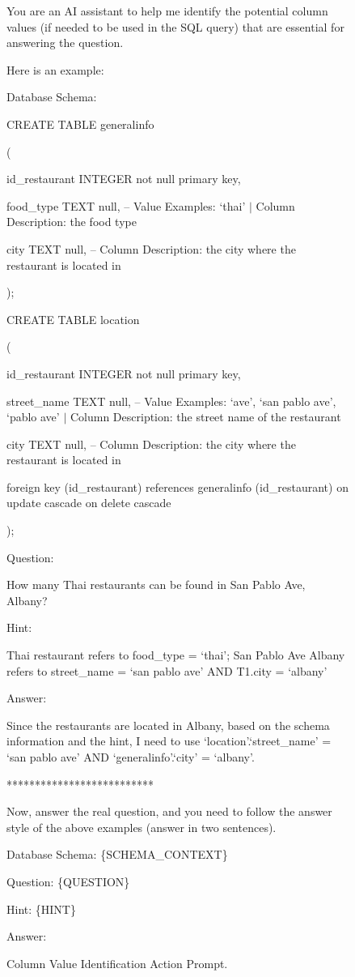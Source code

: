 \begin{figure}[t!]
    \centering
    \begin{tcolorbox}[
        title=Column Value Identification Action Prompt,
        colback=white,        %
        colframe=blue!75!black,  %
        fonttitle=\bfseries,    %
    ]

You are an AI assistant to help me identify the potential column values (if needed to be used in the SQL query) that are essential for answering the question.

Here is an example:

Database Schema:

CREATE TABLE generalinfo

(

	id\_restaurant INTEGER not null primary key,
    
	food\_type TEXT null, -- Value Examples: `thai' $|$ Column Description: the food type
    
	city TEXT null, -- Column Description: the city where the restaurant is located in
    
);

CREATE TABLE location

(

	id\_restaurant INTEGER not null primary key,
    
	street\_name TEXT null, -- Value Examples: `ave', `san pablo ave', 
    `pablo ave' $|$ Column Description: the street name of the restaurant
    
	city TEXT null, -- Column Description: the city where the restaurant is located in
    
	foreign key (id\_restaurant) references generalinfo (id\_restaurant) on update cascade on delete cascade
    
);

Question:

How many Thai restaurants can be found in San Pablo Ave, Albany? 

Hint:

Thai restaurant refers to food\_type = `thai'; San Pablo Ave Albany refers to street\_name = `san pablo ave' AND T1.city = `albany'

Answer:

Since the restaurants are located in Albany, based on the schema information and the hint, I need to use `location'.`street\_name' = `san pablo ave' AND `generalinfo'.`city' = `albany'.

**************************

Now, answer the real question, and you need to follow the answer style of the above examples (answer in two sentences).

Database Schema:
\{SCHEMA\_CONTEXT\}

Question:
\{QUESTION\}

Hint:
\{HINT\}

Answer:
    
    \end{tcolorbox}
    \caption{Column Value Identification Action Prompt.}
    \label{fig:prompt-column-value-identification}
\end{figure}

